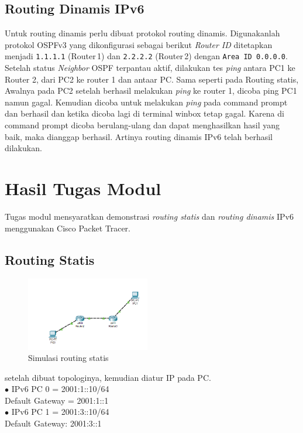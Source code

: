 \subsection{Routing Dinamis IPv6}

Untuk routing dinamis perlu dibuat protokol routing dinamis. Digunakanlah protokol OSPFv3 yang dikonfigurasi sebagai berikut \textit{Router ID} ditetapkan menjadi \texttt{1.1.1.1} (Router\,1) dan \texttt{2.2.2.2} (Router\,2) dengan \texttt{Area ID 0.0.0.0}. Setelah status \textit{Neighbor} OSPF terpantau aktif, dilakukan tes \textit{ping} antara PC1 ke Router 2, dari PC2 ke router 1 dan antaar PC. Sama seperti pada Routing statis, Awalnya pada PC2 setelah berhasil melakukan \textit{ping} ke router 1, dicoba ping PC1 namun gagal. Kemudian dicoba untuk melakukan \textit{ping} pada command prompt dan berhasil dan ketika dicoba lagi di terminal winbox tetap gagal. Karena di command prompt dicoba berulang-ulang dan dapat menghasilkan hasil yang baik, maka dianggap berhasil. Artinya routing dinamis IPv6 telah berhasil dilakukan.

\newpage
\section{Hasil Tugas Modul}

Tugas modul mensyaratkan demonstrasi \textit{routing statis} dan \textit{routing dinamis} IPv6 menggunakan Cisco Packet Tracer.

\subsection{Routing Statis}
\begin{figure}[H]
	\centering
	\includegraphics[width=0.48\textwidth]{img/Topologistatis.png}
	\caption{Simulasi routing statis}
	\label{fig:tumod1}
\end{figure}

setelah dibuat topologinya, kemudian diatur IP pada PC.\\
$\bullet$ IPv6 PC 0 = 2001:1::10/64\\
Default Gateway = 2001:1::1\\
$\bullet$ IPv6 PC 1 = 2001:3::10/64\\
Default Gateway: 2001:3::1\\

